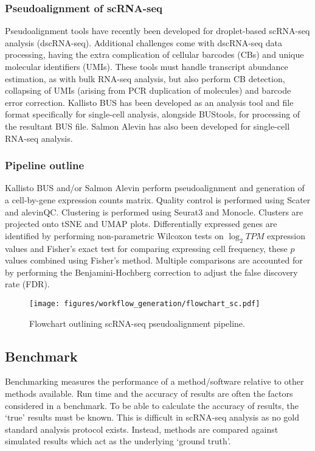 \subsubsection{Pseudoalignment of scRNA-seq}
Pseudoalignment tools have recently been developed for droplet-based scRNA-seq analysis (dscRNA-seq).
Additional challenges come with dscRNA-seq data processing, having the extra complication of cellular barcodes (CBs) and unique molecular identifiers (UMIs).
These tools must handle transcript abundance estimation, as with bulk RNA-seq analysis, but also perform CB detection, collapsing of UMIs (arising from PCR duplication of molecules) and barcode error correction.
Kallisto BUS\cite{melsted2018barcode} has been developed as an analysis tool and file format specifically for single-cell analysis, alongside BUStools, for processing of the resultant BUS file\cite{melsted2019modular}.
Salmon Alevin\cite{srivastava2019alevin} has also been developed for single-cell RNA-seq analysis.

\subsubsection{Pipeline outline}
Kallisto BUS and/or Salmon Alevin perform pseudoalignment and generation of a cell-by-gene expression counts matrix.
Quality control is performed using Scater\cite{mccarthy2017scater} and alevinQC.
Clustering is performed using Seurat3\cite{stuart2019comprehensive} and Monocle\cite{trapnell2014dynamics}.
Clusters are projected onto tSNE and UMAP plots.
Differentially expressed genes are identified by performing non-parametric Wilcoxon tests on $\log_2 TPM$ expression values and Fisher's exact test for comparing expressing cell frequency, these $p$ values combined using Fisher's method.
Multiple comparisons are accounted for by performing the Benjamini-Hochberg correction to adjust the false discovery rate (FDR).

\begin{figure}[htbp]
\centering
\texttt{[image: figures/workflow\_generation/flowchart\_sc.pdf]}
\caption[scRNA-seq pseudoalignment pipeline outline]{Flowchart outlining scRNA-seq pseudoalignment pipeline.}
\label{fig:flowchart_scRNA}
\end{figure}

\subsection{Benchmark}\label{subsec:sc_bench}
Benchmarking measures the performance of a method/software relative to other methods available.
Run time and the accuracy of results are often the factors considered in a benchmark.
To be able to calculate the accuracy of results, the `true' results must be known.
This is difficult in scRNA-seq analysis as no gold standard analysis protocol exists.
Instead, methods are compared against simulated results which act as the underlying `ground truth'.

